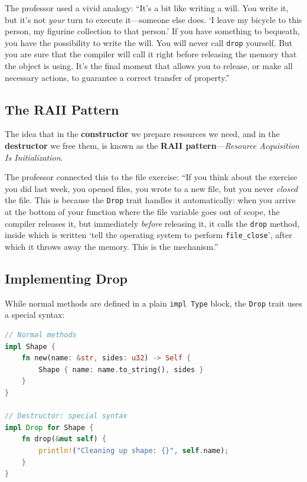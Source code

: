 \begin{insightbox}
The professor used a vivid analogy: ``It's a bit like writing a will. You write it, but it's not \textit{your} turn to execute it---someone else does. `I leave my bicycle to this person, my figurine collection to that person.' If you have something to bequeath, you have the possibility to write the will. You will never call \texttt{drop} yourself. But you are sure that the compiler will call it right before releasing the memory that the object is using. It's the final moment that allows you to release, or make all necessary actions, to guarantee a correct transfer of property.''
\end{insightbox}

\subsection{The RAII Pattern}

The idea that in the \textbf{constructor} we prepare resources we need, and in the \textbf{destructor} we free them, is known as the \textbf{RAII pattern}---\textit{Resource Acquisition Is Initialization}.

The professor connected this to the file exercise: ``If you think about the exercise you did last week, you opened files, you wrote to a new file, but you never \textit{closed} the file. This is because the \texttt{Drop} trait handles it automatically: when you arrive at the bottom of your function where the file variable goes out of scope, the compiler releases it, but immediately \textit{before} releasing it, it calls the \texttt{drop} method, inside which is written `tell the operating system to perform \texttt{file\_close}', after which it throws away the memory. This is the mechanism.''

\subsection{Implementing Drop}

While normal methods are defined in a plain \texttt{impl Type} block, the \texttt{Drop} trait uses a special syntax:

\begin{lstlisting}[language=Rust]
// Normal methods
impl Shape {
    fn new(name: &str, sides: u32) -> Self {
        Shape { name: name.to_string(), sides }
    }
}

// Destructor: special syntax
impl Drop for Shape {
    fn drop(&mut self) {
        println!("Cleaning up shape: {}", self.name);
    }
}
\end{lstlisting}

